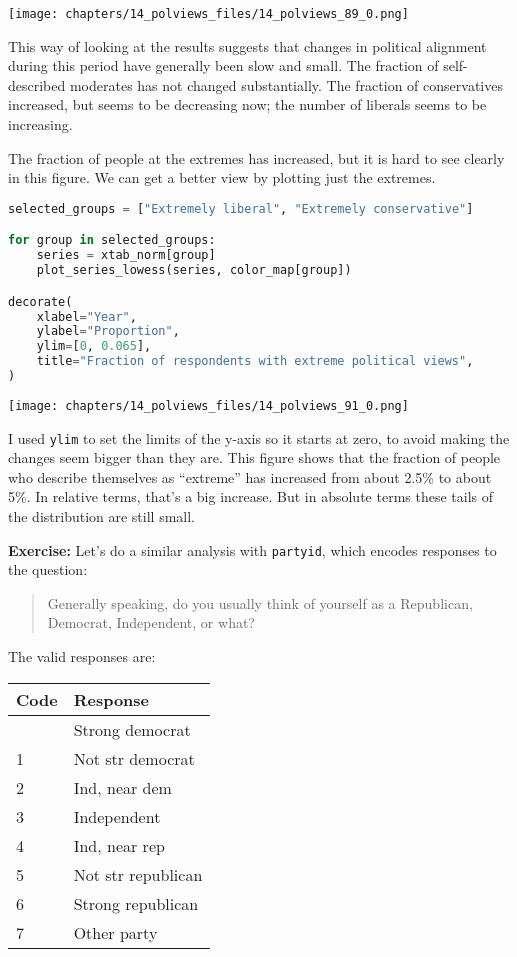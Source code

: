 \begin{center}
\texttt{[image: chapters/14\_polviews\_files/14\_polviews\_89\_0.png]}
\end{center}

This way of looking at the results suggests that changes in political
alignment during this period have generally been slow and small. The
fraction of self-described moderates has not changed substantially. The
fraction of conservatives increased, but seems to be decreasing now; the
number of liberals seems to be increasing.

The fraction of people at the extremes has increased, but it is hard to
see clearly in this figure. We can get a better view by plotting just
the extremes.

\begin{lstlisting}[language=Python,style=source]
selected_groups = ["Extremely liberal", "Extremely conservative"]

for group in selected_groups:
    series = xtab_norm[group]
    plot_series_lowess(series, color_map[group])

decorate(
    xlabel="Year",
    ylabel="Proportion",
    ylim=[0, 0.065],
    title="Fraction of respondents with extreme political views",
)
\end{lstlisting}

\begin{center}
\texttt{[image: chapters/14\_polviews\_files/14\_polviews\_91\_0.png]}
\end{center}

I used \passthrough{\lstinline!ylim!} to set the limits of the y-axis so
it starts at zero, to avoid making the changes seem bigger than they
are. This figure shows that the fraction of people who describe
themselves as ``extreme'' has increased from about 2.5\% to about 5\%.
In relative terms, that's a big increase. But in absolute terms these
tails of the distribution are still small.

\textbf{Exercise:} Let's do a similar analysis with
\passthrough{\lstinline!partyid!}, which encodes responses to the
question:

\begin{quote}
Generally speaking, do you usually think of yourself as a Republican,
Democrat, Independent, or what?
\end{quote}

The valid responses are:

\begin{longtable}[]{@{}ll@{}}
\midrule\noalign{}
Code & Response \\
\midrule\noalign{}
\endhead
\midrule\noalign{}
\endlastfoot
0 & Strong democrat \\
1 & Not str democrat \\
2 & Ind, near dem \\
3 & Independent \\
4 & Ind, near rep \\
5 & Not str republican \\
6 & Strong republican \\
7 & Other party \\
\end{longtable}

